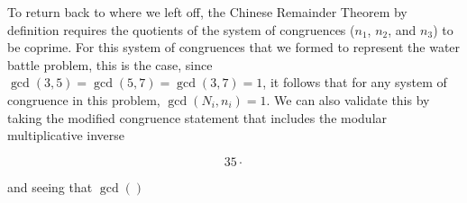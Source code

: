 \documentclass[index]{subfiles}
\begin{document}
To return back to where we left off, the Chinese Remainder Theorem by definition requires the quotients of the system of congruences (\(n_1\), \(n_2\), and \(n_3\)) to be coprime. For this system of congruences that we formed to represent the water battle problem, this is the case, since \(\gcd(3,5)=\gcd(5,7)=\gcd(3,7)=1\), it follows that for any system of congruence in this problem, \(\gcd(N_i,n_i)=1\). We can also validate this by taking the modified congruence statement that includes the modular multiplicative inverse

\begin{equation*}
    35\cdot
\end{equation*}

and seeing that \(\gcd()\)

\newpage

\raggedright{}
\printbibliography[heading=bibintoc]
\end{document}
